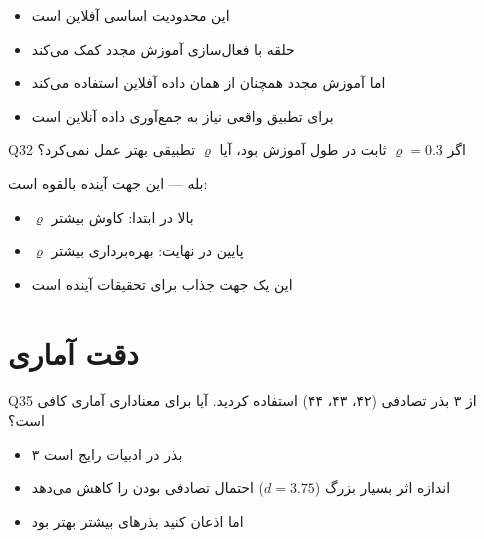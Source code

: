 \documentclass[oneside,openany,a4paper,12pt]{article}
\newcommand{\mapek}{\lr{MAPE-K}}
\begin{document}
\begin{hintbox}
\begin{itemize}
  \item این محدودیت اساسی  آفلاین است
  \item حلقه \mapek{} با فعال‌سازی آموزش مجدد کمک می‌کند
  \item اما آموزش مجدد همچنان از همان داده آفلاین استفاده می‌کند
  \item برای تطبیق واقعی نیاز به جمع‌آوری داده آنلاین است
\end{itemize}
\end{hintbox}

\begin{questionbox}{Q32}
اگر $\varrho=0.3$ ثابت در طول آموزش بود، آیا $\varrho$ تطبیقی بهتر عمل نمی‌کرد؟
\end{questionbox}

\begin{hintbox}
بله — این جهت آینده بالقوه است:
\begin{itemize}
  \item $\varrho$ بالا در ابتدا: کاوش بیشتر
  \item $\varrho$ پایین در نهایت: بهره‌برداری بیشتر
  \item این یک جهت جذاب برای تحقیقات آینده است
\end{itemize}
\end{hintbox}

\section{دقت آماری}

\begin{questionbox}{Q35}
از ۳ بذر تصادفی (۴۲، ۴۳، ۴۴) استفاده کردید. آیا برای معناداری آماری کافی است؟
\end{questionbox}

\begin{hintbox}
\begin{itemize}
  \item ۳ بذر در ادبیات رایج است
  \item اندازه اثر بسیار بزرگ ($d=3.75$) احتمال تصادفی بودن را کاهش می‌دهد
  \item اما اذعان کنید بذرهای بیشتر بهتر بود
\end{itemize}
\end{hintbox}
\end{document}
